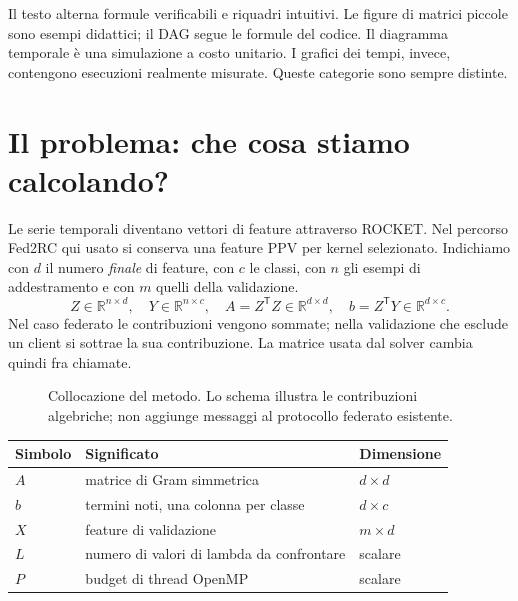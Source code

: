 \documentclass[11pt,a4paper]{article}
\newcommand{\R}{\mathbb{R}}
\newcommand{\T}{\mathsf{T}}
\newcommand{\page}[1]{\clearpage\section{#1}}
\begin{document}
\tableofcontents
\begin{idea}[title=Come leggere il documento]
Il testo alterna formule verificabili e riquadri intuitivi. Le figure di
matrici piccole sono esempi didattici; il DAG segue le formule del codice.
Il diagramma temporale è una simulazione a costo unitario. I grafici dei tempi,
invece, contengono esecuzioni realmente misurate. Queste categorie sono sempre distinte.
\end{idea}
\page{Il problema: che cosa stiamo calcolando?}
Le serie temporali diventano vettori di feature attraverso ROCKET. Nel
percorso Fed2RC qui usato si conserva una feature PPV per kernel selezionato.
Indichiamo con $d$ il numero \emph{finale} di feature, con $c$ le classi,
con $n$ gli esempi di addestramento e con $m$ quelli della validazione.
\[
Z\in\R^{n\times d},\quad Y\in\R^{n\times c},\quad
A=Z^{\T}Z\in\R^{d\times d},\quad b=Z^{\T}Y\in\R^{d\times c}.
\]
Nel caso federato le contribuzioni vengono sommate; nella validazione che
esclude un client si sottrae la sua contribuzione. La matrice usata dal
solver cambia quindi fra chiamate.
\begin{figure}[H]\centering
{}
\caption{Collocazione del metodo. Lo schema illustra le contribuzioni algebriche; non aggiunge messaggi al protocollo federato esistente.}
\end{figure}
\begin{center}\small
\begin{tabularx}{\linewidth}{lXl}\toprule
Simbolo&Significato&Dimensione\\\midrule
$A$&matrice di Gram simmetrica&$d\times d$\\
$b$&termini noti, una colonna per classe&$d\times c$\\
$X$&feature di validazione&$m\times d$\\
$L$&numero di valori di lambda da confrontare&scalare\\
$P$&budget di thread OpenMP&scalare\\\bottomrule
\end{tabularx}\end{center}
\end{document}

